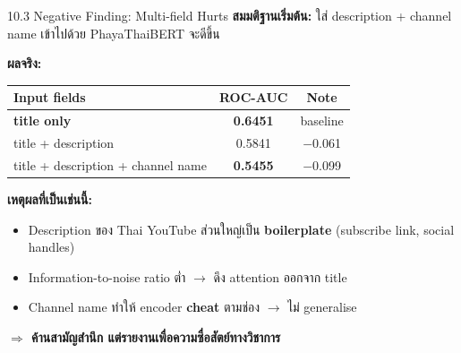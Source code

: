 \documentclass[aspectratio=169,11pt,xcolor=dvipsnames]{beamer}
\newcommand{\hl}[1]{\textcolor{kmitlOrange}{\textbf{#1}}}
\begin{document}
\begin{frame}{10.3 Negative Finding: Multi-field Hurts}
  \textbf{สมมติฐานเริ่มต้น:} ใส่ description + channel name เข้าไปด้วย PhayaThaiBERT จะดีขึ้น
  \vspace{0.3em}

  \textbf{ผลจริง:}
  \begin{center}
    \begin{tabular}{lcc}
      \toprule
      \textbf{Input fields} & \textbf{ROC-AUC} & \textbf{Note}\\
      \midrule
      \hl{title only} & \textbf{0.6451} & baseline\\
      title + description & 0.5841 & $-$0.061\\
      title + description + channel name & \hl{0.5455} & $-$0.099\\
      \bottomrule
    \end{tabular}
  \end{center}
  \vspace{0.4em}
  \textbf{เหตุผลที่เป็นเช่นนี้:}
  \begin{itemize}
    \item Description ของ Thai YouTube ส่วนใหญ่เป็น \hl{boilerplate} (subscribe link, social handles)
    \item Information-to-noise ratio ต่ำ $\rightarrow$ ดึง attention ออกจาก title
    \item Channel name ทำให้ encoder \hl{cheat} ตามช่อง $\rightarrow$ ไม่ generalise
  \end{itemize}
  \begin{center}
    \scriptsize \hl{$\Rightarrow$ ค้านสามัญสำนึก แต่รายงานเพื่อความซื่อสัตย์ทางวิชาการ}
  \end{center}
\end{frame}
\end{document}
